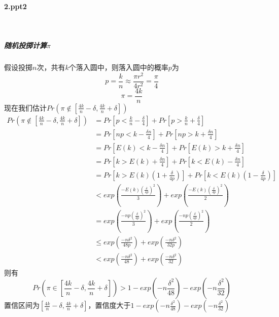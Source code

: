 \paragraph{2.ppt2}~{}
\subparagraph{随机投掷计算$\pi$}

假设投掷$n$次，共有$k$个落入圆中，则落入圆中的概率$p$为
$$
p = \frac{k}{n} \approx \frac{\pi r^2}{4r^2} = \frac{\pi}{4}
$$
$$
\pi = \frac{4k}{n}
$$
现在我们估计$Pr(\pi \notin [\frac{4k}{n}-\delta,\frac{4k}{n}+\delta])$
$$
\begin{aligned}
    Pr(\pi \notin [\frac{4k}{n}-\delta,\frac{4k}{n}+\delta]) 
   &= Pr[p < \frac{k}{n}-\frac{\delta}{4}] + Pr[p>\frac{k}{n}+\frac{\delta}{4}] \\ 
   &= Pr[np < k-\frac{\delta n}{4}] + Pr[np>k+\frac{\delta n}{4}] \\ 
   &= Pr[E(k) < k-\frac{\delta n}{4}] + Pr[E(k)>k+\frac{\delta n}{4}] \\ 
   &= Pr[k > E(k)+\frac{\delta n}{4}] + Pr[k < E(k)-\frac{\delta n}{4}] \\ 
   &= Pr[k > E(k)(1+\frac{\delta}{4p})] + Pr[k < E(k)(1-\frac{\delta}{4p})] \\ 
   &< exp(\frac{-E(k)(\frac{\delta}{4p})^2}{3}) + exp(\frac{-E(k)(\frac{\delta}{4p})^2}{2}) \\
   &= exp(\frac{-np(\frac{\delta}{4p})^2}{3}) + exp(\frac{-np(\frac{\delta}{4p})^2}{2})\\
   &\le exp(\frac{-n\delta^2}{48p}) + exp(\frac{-n\delta ^2}{32p})\\
   &< exp(\frac{-n\delta^2}{48}) + exp(\frac{-n\delta ^2}{32})
\end{aligned}
$$
则有
$$
Pr(\pi \in [\frac{4k}{n}-\delta,\frac{4k}{n}+\delta]) > 1 - exp(-n\frac{\delta^2}{48}) - exp(-n\frac{\delta ^2}{32})
$$
置信区间为$[\frac{4k}{n}-\delta,\frac{4k}{n}+\delta]$，置信度大于$1 - exp(-n\frac{\delta^2}{48}) - exp(-n\frac{\delta ^2}{32})$